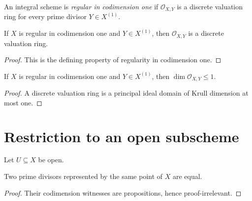 \begin{definition}
  \label{def:isRegularInCodimensionOne}
  \leanok

  An integral scheme is \emph{regular in codimension one} if
  \(\mathcal O_{X,Y}\) is a discrete valuation ring for every prime divisor
  \(Y\in X^{(1)}\).
\end{definition}

\begin{lemma}
  \label{def:isRegularInCodimOne_dvrStalk}
  \leanok

  If \(X\) is regular in codimension one and \(Y\in X^{(1)}\), then
  \(\mathcal O_{X,Y}\) is a discrete valuation ring.
\end{lemma}
\begin{proof}
  \leanok
  This is the defining property of regularity in codimension one.
\end{proof}

\begin{lemma}
  \label{def:isRegularInCodimOne_krullDimStalk}
  \leanok

  If \(X\) is regular in codimension one and \(Y\in X^{(1)}\), then
  \(\dim\mathcal O_{X,Y}\leq 1\).
\end{lemma}
\begin{proof}
  \leanok
  A discrete valuation ring is a principal ideal domain of Krull dimension
  at most one.
\end{proof}

\section{Restriction to an open subscheme}
\label{sec:open_immersion_descent}

Let \(U\subseteq X\) be open.

\begin{lemma}
  \label{lem:primeDivisor_ext}
  \leanok

  Two prime divisors represented by the same point of \(X\) are equal.
\end{lemma}
\begin{proof}
  \leanok
  Their codimension witnesses are propositions, hence proof-irrelevant.
\end{proof}

